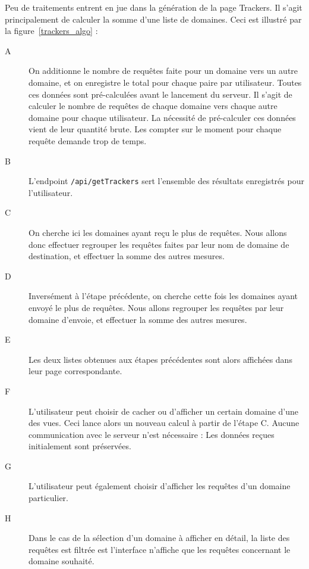 		Peu de traitements entrent en jue dans la génération de la page Trackers. Il s'agit principalement de calculer la somme d'une liste de domaines. Ceci est illustré par la figure~\ref{trackers_algo} :
		\begin{description}
			\item[A] On additionne le nombre de requêtes faite pour un domaine vers un autre domaine, et on enregistre le total pour chaque paire par utilisateur. Toutes ces données sont pré-calculées avant le lancement du serveur. Il s'agit de calculer le nombre de requêtes de chaque domaine vers chaque autre domaine pour chaque utilisateur. La nécessité de pré-calculer ces données vient de leur quantité brute. Les compter sur le moment pour chaque requête demande trop de temps.

			\item[B] L'endpoint \texttt{/api/getTrackers} sert l'ensemble des résultats enregistrés pour l'utilisateur.

			\item[C] On cherche ici les domaines ayant reçu le plus de requêtes. Nous allons donc effectuer regrouper les requêtes faites par leur nom de domaine de destination, et effectuer la somme des autres mesures.

			\item[D] Inversément à l'étape précédente, on cherche cette fois les domaines ayant envoyé le plus de requêtes. Nous allons regrouper les requêtes par leur domaine d'envoie, et effectuer la somme des autres mesures.

			\item[E] Les deux listes obtenues aux étapes précédentes sont alors affichées dans leur page correspondante.

			\item[F] L'utilisateur peut choisir de cacher ou d'afficher un certain domaine d'une des vues. Ceci lance alors un nouveau calcul à partir de l'étape C. Aucune communication avec le serveur n'est nécessaire : Les données reçues initialement sont préservées.

			\item[G] L'utilisateur peut également choisir d'afficher les requêtes d'un domaine particulier.

			\item[H] Dans le cas de la sélection d'un domaine à afficher en détail, la liste des requêtes est filtrée est l'interface n'affiche que les requêtes concernant le domaine souhaité.
		\end{description}				

